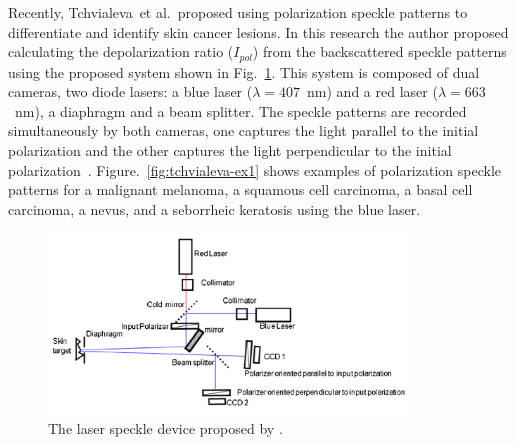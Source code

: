 Recently, Tchvialeva~et al.\,\cite{tchvialeva2013polarization} proposed using polarization speckle patterns to differentiate and identify skin cancer lesions.
In this research the author proposed calculating the depolarization ratio ($I_{pol}$) from the backscattered speckle patterns using the proposed system shown in Fig.~\ref{fig:TchialevaSys}.
This system is composed of dual cameras, two diode lasers: a blue laser ($\lambda = 407$~\si{\nano\meter}) and a red laser ($\lambda = 663$~\si{\nano\meter}), a diaphragm and a beam splitter.
The speckle patterns are recorded simultaneously by both cameras, one captures the light parallel to the initial polarization and the other captures the light perpendicular to the initial polarization~\cite{tchvialeva2013polarization}.
Figure.~\ref{fig:tchvialeva-ex1} shows examples of polarization speckle patterns for a malignant melanoma, a squamous cell carcinoma, a basal cell carcinoma, a nevus, and a seborrheic keratosis using the blue laser. 
\begin{figure}[tb]
\begin{center}
\includegraphics[width= 0.85\textwidth]{Chapter4/Figures/TchvialevaSys.png}
\caption[Polarimetry system proposed by \cite{tchvialeva2013polarization}]{The laser speckle device proposed by \cite{tchvialeva2013polarization}.}
\label{fig:TchialevaSys}
\end{center}
\end{figure}
